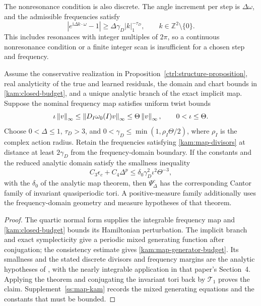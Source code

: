 The nonresonance condition is also discrete. The angle increment per step is $\Delta\omega$, and the admissible frequencies satisfy
\begin{equation}\label{kam:map-divisors}
 \left|e^{\mathrm i\Delta k\cdot\omega}-1\right|
       \ge\Delta\gamma_D|k|_1^{-\tau_D},
       \qquad k\in\mathbb Z^2\setminus\{0\}.
\end{equation}
This includes resonances with integer multiples of $2\pi$, so a continuous nonresonance condition or a finite integer scan is insufficient for a chosen step and frequency.

\begin{proposition}
\label{kam:map-theorem}
Assume the conservative realization in Proposition~\ref{ctrl:structure-proposition}, real analyticity of the true and learned residuals, the domain and chart bounds in \eqref{kam:closed-budget}, and a unique analytic branch of the exact implicit map. Suppose the nominal frequency map satisfies uniform twist bounds
\[
 \iota\left\lVert v\right\rVert_\infty\le\left\lVert D_I\omega_0(I)v\right\rVert_\infty
                \le\Theta\left\lVert v\right\rVert_\infty,
 \qquad0<\iota\le\Theta.
\]
Choose $0<\Delta\le1$, $\tau_D>3$, and
$0<\gamma_D\le\min(1,\rho_I\Theta/2)$,
where $\rho_I$ is the complex action radius. Retain the frequencies satisfying \eqref{kam:map-divisors} at distance at least $2\gamma_D$ from the frequency-domain boundary. If the constants and the reduced analytic domain satisfy the smallness inequality
\begin{equation}\label{kam:map-smallness}
 C_3\epsilon_c+C_4\Delta^p
       \le\delta_0\gamma_D^2\iota^2\Theta^{-3},
\end{equation}
with the $\delta_0$ of the analytic map theorem, then $\Psi_\Delta^c$ has the corresponding Cantor family of invariant quasiperiodic tori. A positive-measure family additionally uses the frequency-domain geometry and measure hypotheses of that theorem.
\end{proposition}

\begin{proof}
The quartic normal form supplies the integrable frequency map and \eqref{kam:closed-budget} bounds its Hamiltonian perturbation. The implicit branch and exact symplecticity give a periodic mixed generating function after conjugation; the consistency estimate gives \eqref{kam:map-generator-budget}. Its smallness and the stated discrete divisors and frequency margins are the analytic hypotheses of \citet[Theorem~2 and Remark~2]{shang}, with the nearly integrable application in that paper's Section~4. Applying the theorem and conjugating the invariant tori back by $\mathcal T_1$ proves the claim. Supplement~\ref{ss:map-kam} records the mixed generating equations and the constants that must be bounded.
\end{proof}

